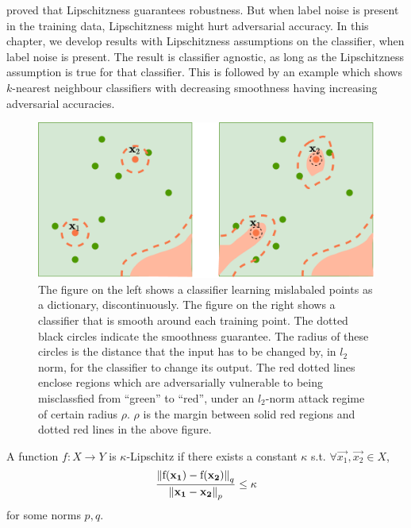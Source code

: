 \documentclass{ociamthesis}
\begin{document}
\citet{DBLP:conf/nips/HeinA17} proved that Lipschitzness guarantees robustness.
But when label noise is present in the training data, Lipschitzness might hurt
adversarial accuracy. In this chapter, we develop results with Lipschitzness
assumptions on the classifier, when label noise is present. The result is
classifier agnostic, as long as the Lipschitzness assumption is true for that
classifier. This is followed by an example which shows $k$-nearest neighbour
classifiers with decreasing smoothness having increasing adversarial accuracies.

\begin{figure}
    \centering
    \includegraphics[scale=0.3]{memorizing-as-dictionary}
    \caption{The figure on the left shows a classifier learning mislabaled
    points as a dictionary, discontinuously. The figure on the right shows a
    classifier that is smooth around each training point. The dotted black
    circles indicate the smoothness guarantee. The radius of these circles is
    the distance that the input has to be changed by, in $l_2$ norm, for the
    classifier to change its output. The red dotted lines enclose regions which
    are adversarially vulnerable to being misclassfied from ``green'' to
    ``red'', under an $l_2$-norm attack regime of certain radius $\rho$. $\rho$
    is the margin between solid red regions and dotted red lines in the above
    figure.}
    \label{fig:dictionary}
\end{figure}



A function $f: X \to Y$ is $\kappa$-Lipschitz if there exists a constant
$\kappa$ s.t. $\forall \vec{x_1}, \vec{x_2} \in X$,
\begin{equation*}
    \label{eq:Lipschitz}
    \frac{\mathrm{\left\lVert{f({\mathbf{x_1}}) - f({\mathbf{x_2}})}\right\rVert}_q}
        {\mathrm{\left\lVert{{\mathbf{x_1}} - {\mathbf{x_2}}}\right\rVert}_p}
    \leq \kappa
\end{equation*}
for some norms $p, q$.
\end{document}
